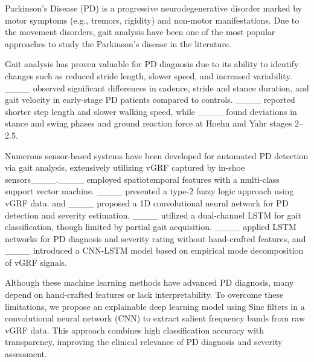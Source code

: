 Parkinson's Disease (PD) is a progressive neurodegenerative disorder marked by motor symptoms (e.g., tremors, rigidity) and non-motor manifestations. Due to the movement disorders, gait analysis have been one of the most popular approaches to study the Parkinson's disease in the literature. 

Gait analysis has proven valuable for PD diagnosis due to its ability to identify changes such as reduced stride length, slower speed, and increased variability. ____ observed significant differences in cadence, stride and stance duration, and gait velocity in early-stage PD patients compared to controls. ____ reported shorter step length and slower walking speed, while ____ found deviations in stance and swing phases and ground reaction force at Hoehn and Yahr stages 2--2.5.


Numerous sensor-based systems have been developed for automated PD detection via gait analysis, extensively utilizing vGRF captured by in-shoe sensors____.____ employed spatiotemporal features with a multi-class support vector machine. ____ presented a type-2 fuzzy logic approach using vGRF data. and ____ proposed a 1D convolutional neural network for PD detection and severity estimation. ____ utilized a dual-channel LSTM for gait classification, though limited by partial gait acquisition. ____ applied LSTM networks for PD diagnosis and severity rating without hand-crafted features, and ____ introduced a CNN-LSTM model based on empirical mode decomposition of vGRF signals.

Although these machine learning methods have advanced PD diagnosis, many depend on hand-crafted features or lack interpretability.
 To overcome these limitations, we propose an explainable deep learning model using Sinc filters in a convolutional neural network (CNN) to extract salient frequency bands from raw vGRF data. This approach combines high classification accuracy with transparency, improving the clinical relevance of PD diagnosis and severity assessment.




